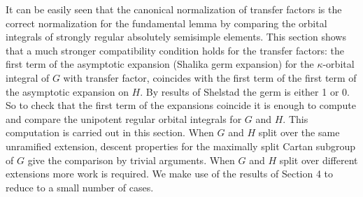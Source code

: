 \documentclass{amsart}
\def\SHELSTAD{24}
\begin{document}
It can be easily seen that the canonical normalization of transfer factors is the
correct normalization for the fundamental lemma by comparing the orbital integrals
of strongly regular absolutely semisimple elements.   This section shows that
a much stronger compatibility condition holds for the transfer factors: the first
term of the asymptotic expansion (Shalika germ expansion) for the $\kappa$-orbital integral
of $G$ with transfer factor, coincides with the first term of the first term of the
asymptotic expansion on $H$.  By results of Shelstad \cite{\SHELSTAD} the germ is
either 1 or 0.  So to check that the first term of the expansions coincide it is
enough to compute and compare the unipotent regular orbital integrals for $G$ and $H$.
This computation is carried out in this section.   When $G$ and $H$ split over the
same unramified extension, descent properties for the maximally split Cartan subgroup of $G$
give the comparison by trivial arguments.  
When $G$ and $H$ split over different extensions more work
is required.  We make use of the results of Section 4 to reduce to a small number
of cases.
\end{document}
